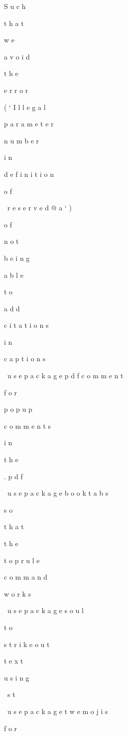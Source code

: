 %
 
S
u
c
h
 
t
h
a
t
 
w
e
 
a
v
o
i
d
 
t
h
e
 
e
r
r
o
r
 
(
`
I
l
l
e
g
a
l
 
p
a
r
a
m
e
t
e
r
 
n
u
m
b
e
r
 
i
n
 
d
e
f
i
n
i
t
i
o
n
 
o
f
 
\
r
e
s
e
r
v
e
d
@
a
`
)
 
o
f
 
n
o
t
 
b
e
i
n
g
 
a
b
l
e
 
t
o
 
a
d
d
 
c
i
t
a
t
i
o
n
s
 
i
n
 
c
a
p
t
i
o
n
s

\
u
s
e
p
a
c
k
a
g
e
{
p
d
f
c
o
m
m
e
n
t
}
 
%
 
f
o
r
 
p
o
p
u
p
 
c
o
m
m
e
n
t
s
 
i
n
 
t
h
e
 
.
p
d
f

\
u
s
e
p
a
c
k
a
g
e
{
b
o
o
k
t
a
b
s
}
 
%
 
s
o
 
t
h
a
t
 
t
h
e
 
t
o
p
r
u
l
e
 
c
o
m
m
a
n
d
 
w
o
r
k
s

\
u
s
e
p
a
c
k
a
g
e
{
s
o
u
l
}
 
%
 
t
o
 
s
t
r
i
k
e
o
u
t
 
t
e
x
t
 
u
s
i
n
g
 
\
s
t
{
}

\
u
s
e
p
a
c
k
a
g
e
{
t
w
e
m
o
j
i
s
}
 
%
 
f
o
r
 
